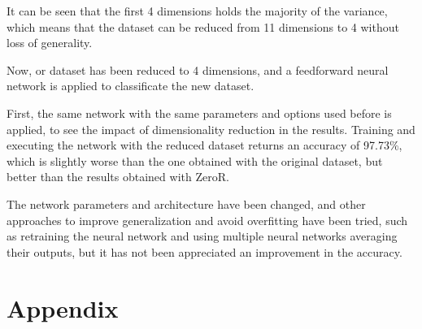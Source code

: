 \documentclass[10pt]{article}
\begin{document}
\begin{multicols}{2}
    It can be seen that the first 4 dimensions holds the majority of the variance,
    which means that the dataset can be reduced from 11 dimensions to 4 without loss
    of generality.

    Now, or dataset has been reduced to 4 dimensions, and a feedforward neural
    network is applied to classificate the new dataset.

    First, the same network with the same parameters and options used before is
    applied, to see the impact of dimensionality reduction in the results.
    Training and executing the network with the reduced dataset returns an
    accuracy of 97.73\%, which is slightly worse than the one obtained with
    the original dataset, but better than the results obtained with ZeroR.

    The network parameters and architecture have been changed, and other approaches
    to improve generalization and avoid overfitting have been tried, such as
    retraining the neural network and using multiple neural networks averaging
    their outputs, but it has not been appreciated an improvement in the accuracy.

  \end{multicols}

  \newpage
  \section*{Appendix}
\end{document}
